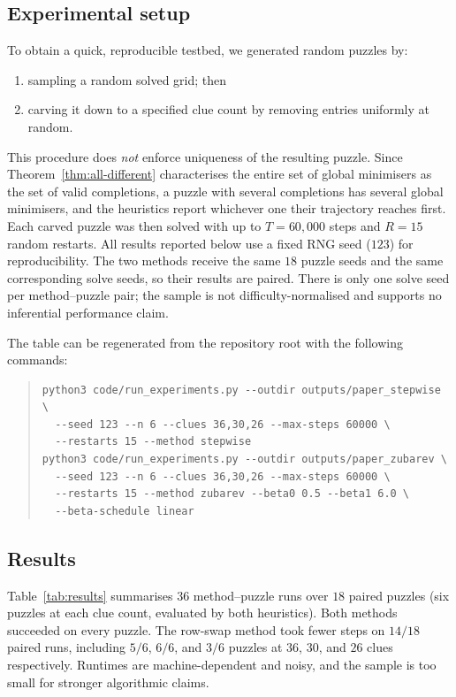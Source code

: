 \documentclass[11pt]{article}
\begin{document}
\subsection{Experimental setup}
To obtain a quick, reproducible testbed, we generated random puzzles by:
\begin{enumerate}
    \item sampling a random solved grid; then
    \item carving it down to a specified clue count by removing entries uniformly at random.
\end{enumerate}
This procedure does \emph{not} enforce uniqueness of the resulting puzzle. Since Theorem~\ref{thm:all-different} characterises the entire set of global minimisers as the set of valid completions, a puzzle with several completions has several global minimisers, and the heuristics report whichever one their trajectory reaches first. Each carved puzzle was then solved with up to $T=60{,}000$ steps and $R=15$ random restarts. All results reported below use a fixed RNG seed ($123$) for reproducibility. The two methods receive the same \(18\) puzzle seeds and the same corresponding solve seeds, so their results are paired. There is only one solve seed per method--puzzle pair; the sample is not difficulty-normalised and supports no inferential performance claim.

The table can be regenerated from the repository root with the following commands:
\begin{quote}\small
\begin{verbatim}
python3 code/run_experiments.py --outdir outputs/paper_stepwise \
  --seed 123 --n 6 --clues 36,30,26 --max-steps 60000 \
  --restarts 15 --method stepwise
python3 code/run_experiments.py --outdir outputs/paper_zubarev \
  --seed 123 --n 6 --clues 36,30,26 --max-steps 60000 \
  --restarts 15 --method zubarev --beta0 0.5 --beta1 6.0 \
  --beta-schedule linear
\end{verbatim}
\end{quote}

\subsection{Results}
Table~\ref{tab:results} summarises \(36\) method--puzzle runs over \(18\) paired puzzles (six puzzles at each clue count, evaluated by both heuristics). Both methods succeeded on every puzzle. The row-swap method took fewer steps on \(14/18\) paired runs, including \(5/6\), \(6/6\), and \(3/6\) puzzles at \(36\), \(30\), and \(26\) clues respectively. Runtimes are machine-dependent and noisy, and the sample is too small for stronger algorithmic claims.
\end{document}
